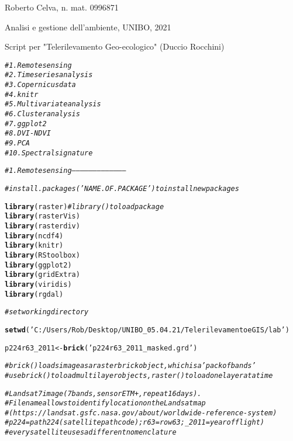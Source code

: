 \documentclass{article}\usepackage[]{graphicx}\usepackage[]{color}
\makeatletter
\newcommand{\hlstr}[1]{\textcolor[rgb]{0.192,0.494,0.8}{#1}}%
\newcommand{\hlcom}[1]{\textcolor[rgb]{0.678,0.584,0.686}{\textit{#1}}}%
\newcommand{\hlstd}[1]{\textcolor[rgb]{0.345,0.345,0.345}{#1}}%
\newcommand{\hlkwb}[1]{\textcolor[rgb]{0.69,0.353,0.396}{#1}}%
\newcommand{\hlkwd}[1]{\textcolor[rgb]{0.737,0.353,0.396}{\textbf{#1}}}%
\newenvironment{kframe}{%
 \def\at@end@of@kframe{}%
 \ifinner\ifhmode%
  \def\at@end@of@kframe{\end{minipage}}%
  \begin{minipage}{\columnwidth}%
 \fi\fi%
 \def\FrameCommand##1{\hskip\@totalleftmargin \hskip-\fboxsep
 \colorbox{shadecolor}{##1}\hskip-\fboxsep
     \hskip-\linewidth \hskip-\@totalleftmargin \hskip\columnwidth}%
 \MakeFramed {\advance\hsize-\width
   \@totalleftmargin\z@ \linewidth\hsize
   \@setminipage}}%
 {\par\unskip\endMakeFramed%
 \at@end@of@kframe}
\newenvironment{knitrout}{}{} %
\makeatother
\begin{document}
\title{\title{}}



\maketitle
Roberto  Celva, n. mat. 0996871

Analisi e gestione dell'ambiente, UNIBO, 2021

Script per "Telerilevamento Geo-ecologico" (Duccio Rocchini)

\begin{knitrout}
\color{fgcolor}\begin{kframe}
\begin{alltt}

\hlcom{# 1. Remote sensing}
\hlcom{# 2. Time series analysis}
\hlcom{# 3. Copernicus data}
\hlcom{# 4. knitr}
\hlcom{# 5. Multivariate analysis}
\hlcom{# 6. Cluster analysis}
\hlcom{# 7. ggplot2}
\hlcom{# 8. DVI - NDVI}
\hlcom{# 9. PCA}
\hlcom{# 10. Spectral signature}

\hlcom{# 1. Remote sensing---------------------------------------}

\hlcom{# install.packages('NAME.OF.PACKAGE') to install new packages}

\hlkwd{library}\hlstd{(raster)} \hlcom{# library() to load package}
\hlkwd{library}\hlstd{(rasterVis)}
\hlkwd{library}\hlstd{(rasterdiv)}
\hlkwd{library}\hlstd{(ncdf4)}
\hlkwd{library}\hlstd{(knitr)}
\hlkwd{library}\hlstd{(RStoolbox)}
\hlkwd{library}\hlstd{(ggplot2)}
\hlkwd{library}\hlstd{(gridExtra)}
\hlkwd{library}\hlstd{(viridis)}
\hlkwd{library}\hlstd{(rgdal)}

\hlcom{# set working directory}

\hlkwd{setwd}\hlstd{(}\hlstr{'C:/Users/Rob/Desktop/UNIBO_05.04.21/Telerilevamento e GIS/lab'}\hlstd{)}

\hlstd{p224r63_2011} \hlkwb{<-} \hlkwd{brick}\hlstd{(}\hlstr{'p224r63_2011_masked.grd'}\hlstd{)}

\hlcom{# brick() loads image as a rasterbrick object, which is a 'pack of bands'}
\hlcom{# use brick() to load multilayer objects, raster() to load one layer at a time}

\hlcom{# Landsat7 image (7 bands, sensor ETM+, repeat 16 days).}
\hlcom{# File name allows to identify location on the Landsat map}
\hlcom{# (https://landsat.gsfc.nasa.gov/about/worldwide-reference-system)}
\hlcom{# p224 = path224 (satellite path code); r63 = row 63; _2011 = year of flight)}
\hlcom{# every satellite uses a different nomenclature}


\end{alltt}
\end{kframe}
\end{knitrout}
\end{document}
